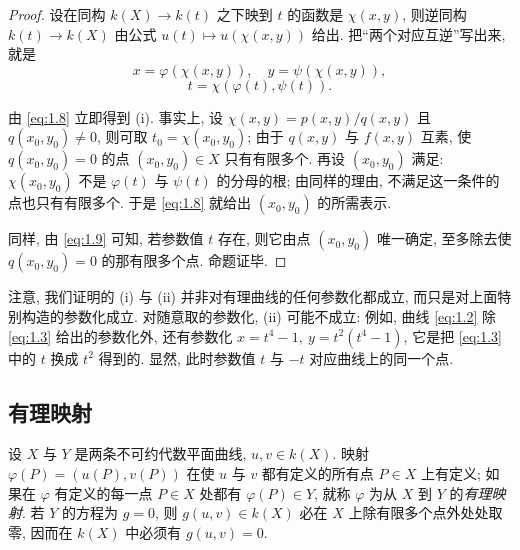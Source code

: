 \begin{proof}
	设在同构 $k(X) \to k(t)$ 之下映到 $t$ 的函数是 $\chi(x,y)$, 则逆同构 $k(t) \to k(X)$ 由公式 $u(t) \mapsto u(\chi(x,y))$ 给出. 把``两个对应互逆''写出来, 就是
	\begin{equation}
		\label{eq:1.8}
		x = \varphi(\chi(x,y)), \quad y = \psi(\chi(x,y)),
	\end{equation}
	\begin{equation}
		\label{eq:1.9}
		t = \chi(\varphi(t), \psi(t)).
	\end{equation}

	由 \eqref{eq:1.8} 立即得到 (i). 事实上, 设 $\chi(x,y) = p(x,y)/q(x,y)$ 且 $q(x_0, y_0) \ne 0$, 则可取 $t_0 = \chi(x_0, y_0)$; 由于 $q(x,y)$ 与 $f(x,y)$ 互素, 使 $q(x_0, y_0) = 0$ 的点 $(x_0, y_0) \in X$ 只有有限多个. 再设 $(x_0, y_0)$ 满足: $\chi(x_0, y_0)$ 不是 $\varphi(t)$ 与 $\psi(t)$ 的分母的根; 由同样的理由, 不满足这一条件的点也只有有限多个. 于是 \eqref{eq:1.8} 就给出 $(x_0, y_0)$ 的所需表示.

	同样, 由 \eqref{eq:1.9} 可知, 若参数值 $t$ 存在, 则它由点 $(x_0, y_0)$ 唯一确定, 至多除去使 $q(x_0, y_0) = 0$ 的那有限多个点. 命题证毕.
\end{proof}

\begin{remark}\label{rem:param-not-unique}
	注意, 我们证明的 (i) 与 (ii) 并非对有理曲线的任何参数化都成立, 而只是对上面特别构造的参数化成立. 对随意取的参数化, (ii) 可能不成立: 例如, 曲线 \eqref{eq:1.2} 除 \eqref{eq:1.3} 给出的参数化外, 还有参数化 $x = t^4 - 1,\ y = t^2(t^4 - 1)$, 它是把 \eqref{eq:1.3} 中的 $t$ 换成 $t^2$ 得到的. 显然, 此时参数值 $t$ 与 $-t$ 对应曲线上的同一个点.
\end{remark}

\subsection{有理映射}

\begin{definition}[有理映射]\label{def:rational-map}
	设 $X$ 与 $Y$ 是两条不可约代数平面曲线, $u, v \in k(X)$. 映射 $\varphi(P) = (u(P), v(P))$ 在使 $u$ 与 $v$ 都有定义的所有点 $P \in X$ 上有定义; 如果在 $\varphi$ 有定义的每一点 $P \in X$ 处都有 $\varphi(P) \in Y$, 就称 $\varphi$ 为从 $X$ 到 $Y$ 的\emph{有理映射}. 若 $Y$ 的方程为 $g = 0$, 则 $g(u,v) \in k(X)$ 必在 $X$ 上除有限多个点外处处取零, 因而在 $k(X)$ 中必须有 $g(u,v) = 0$.
\end{definition}


